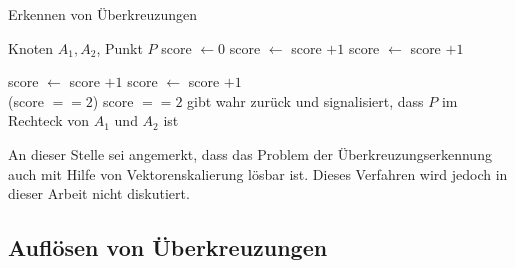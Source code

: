\begin{algorithm}[H]
    \caption{Erkennen von Überkreuzungen}
    \label{alg:check-point-in-rect}
    \begin{algorithmic}[1]
        \Require Knoten $A_1,A_2$, Punkt $P$
        \State score $\gets 0$
                \State score $\gets$ score $+ 1$
            \EndIf
        \Else
                \State score $\gets$ score $+ 1$
            \EndIf
        \EndIf

                \State score $\gets$ score $+ 1$
            \EndIf
        \Else
                \State score $\gets$ score $+ 1$
            \EndIf
        \EndIf\\
        \Return (score $== 2$)
        \Comment score $==2$ gibt wahr zurück und signalisiert, dass $P$ im Rechteck von $A_1$ und $A_2$ ist
    \end{algorithmic}
\end{algorithm}
An dieser Stelle sei angemerkt, dass das Problem der Überkreuzungserkennung auch mit Hilfe von Vektorenskalierung lösbar ist.
Dieses Verfahren wird jedoch in dieser Arbeit nicht diskutiert.


\subsection{Auflösen von Überkreuzungen}

